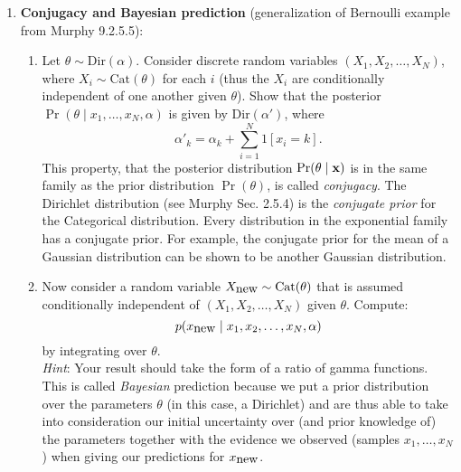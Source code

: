 \documentclass{article}
\begin{document}
\begin{enumerate}
\item {\bf Conjugacy and Bayesian prediction} (generalization of
  Bernoulli example from Murphy 9.2.5.5):
\begin{enumerate}
\item Let $\theta \sim \mbox{Dir}(\alpha)$. Consider discrete random variables 
$(X_1, X_2, \ldots, X_N)$, where $X_i \sim \mbox{Cat}(\theta)$ for each $i$ 
(thus the $X_i$ are conditionally independent of one another given
$\theta$). 
Show that the posterior $\Pr(\theta \mid x_1, \ldots, x_N, \alpha)$ is given by $\mbox{Dir}(\alpha')$, where
\[
\alpha'_k = \alpha_k + \sum_{i=1}^N 1[x_i = k].
\]
This property, that the posterior distribution $\Pr(\theta \mid {\bf
  x})$ is in the same family as the prior distribution $\Pr(\theta)$,
is called {\em conjugacy}. The Dirichlet distribution (see
Murphy Sec. 2.5.4) is the {\em conjugate prior} for the Categorical distribution. Every distribution in the exponential family has a conjugate prior. For example, the conjugate prior for the mean of a Gaussian distribution can be shown to be another Gaussian distribution.

\item Now consider a random variable $X_{\mbox{\rm new}} \sim \mbox{Cat}(\theta)$ 
that is assumed conditionally independent of $(X_1, X_2, \ldots, X_N)$ 
given $\theta$.  Compute:
\[
p(x_{\mbox{\rm new}} \mid x_1, x_2, \ldots, x_N, \alpha)
\]
by integrating over $\theta$.\\

{\em Hint}: Your result should take the form of a ratio of gamma functions.\\

This is called {\em Bayesian} prediction because we put a prior distribution over the parameters $\theta$ (in this case, a Dirichlet) and are thus able to take into consideration our initial uncertainty over (and prior knowledge of) the parameters together with the evidence we observed (samples $x_1, \ldots, x_N$) when giving our predictions for $x_{\mbox{\rm new}}$.
\end{enumerate}


\end{enumerate}
\end{document}
